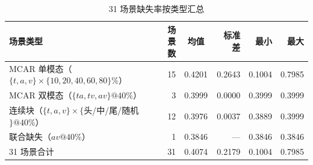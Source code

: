 \begin{table}[htbp]
  \centering\small
  \caption{31 场景缺失率按类型汇总}
  \label{tab:p2-missrate-summary}
  \begin{tabularx}{\textwidth}{@{}Xrcrrr@{}}
    \toprule
    场景类型 & 场景数 & 均值 & 标准差 & 最小 & 最大 \\
    \midrule
    MCAR 单模态（$\{t,a,v\}\times\{10,20,40,60,80\}\%$）   & 15 & 0.4201 & 0.2643 & 0.1004 & 0.7985 \\
    MCAR 双模态（$\{ta,tv,av\}@40\%$）                     &  3 & 0.3999 & 0.0000 & 0.3999 & 0.3999 \\
    连续块（$\{t,a,v\}\times\{$头/中/尾/随机$\}@40\%$）   & 12 & 0.3976 & 0.0037 & 0.3889 & 0.3999 \\
    联合缺失（$av@40\%$）                                  &  1 & 0.3846 & ---    & 0.3846 & 0.3846 \\
    \midrule
    31 场景合计                                            & 31 & 0.4074 & 0.2179 & 0.1004 & 0.7985 \\
    \bottomrule
  \end{tabularx}
  \par \smallskip
  \end{table}